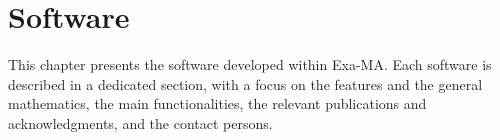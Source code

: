 \clearpage
\chapter{Software}
\label{sec:software}
This chapter presents the software developed within Exa-MA. Each software is described in a dedicated section, with a focus on the features and the general mathematics, the main functionalities, the relevant publications and acknowledgments, and the contact persons.















